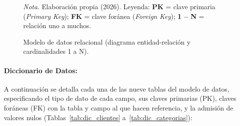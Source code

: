 \documentclass[12pt,a4paper]{article}
\begin{document}
\begin{figure}[H]
  \centering
  \caption{Modelo de datos relacional (diagrama entidad-relación y cardinalidades 1 a N).}
  \label{fig:modelo_datos_er}
  \resizebox{\textwidth}{!}{}
  \par\vspace{0.2cm}
  {\raggedright \small \emph{Nota.} Elaboración propia (2026). Leyenda: \textbf{PK} = clave primaria (\emph{Primary Key}); \textbf{FK} = clave foránea (\emph{Foreign Key}); \textbf{1 -- N} = relación uno a muchos.\par}
\end{figure}

\paragraph{Diccionario de Datos:}
A continuación se detalla cada una de las nueve tablas del modelo de datos, especificando el tipo de dato de cada campo, sus claves primarias (PK), claves foráneas (FK) con la tabla y campo al que hacen referencia, y la admisión de valores nulos (Tablas~\ref{tab:dic_clientes} a~\ref{tab:dic_categorias}):


\end{document}
